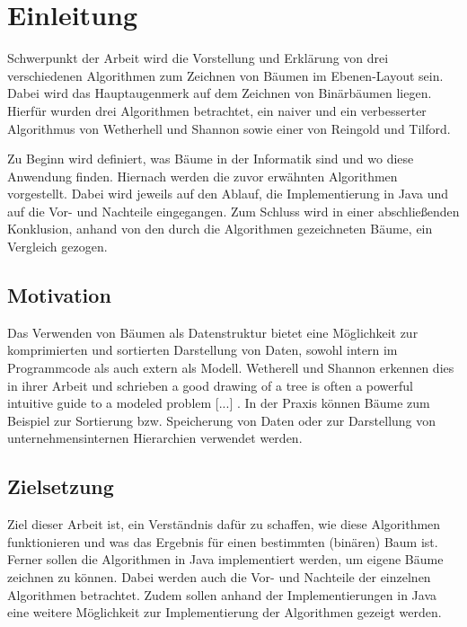 \chapter{Einleitung}
\label{chap:einleitung}
Schwerpunkt der Arbeit wird die Vorstellung und Erklärung von drei verschiedenen Algorithmen zum
Zeichnen von Bäumen im Ebenen-Layout sein. Dabei wird das Hauptaugenmerk auf dem Zeichnen
von Binärbäumen liegen. Hierfür wurden drei Algorithmen betrachtet, ein naiver und ein verbesserter Algorithmus von
Wetherhell und Shannon sowie einer von Reingold und Tilford. 

Zu Beginn wird definiert, was Bäume in der Informatik sind und wo diese Anwendung finden. Hiernach werden die zuvor erwähnten Algorithmen
vorgestellt. Dabei wird jeweils auf den Ablauf, die Implementierung in Java und auf die Vor- und Nachteile eingegangen. 
Zum Schluss wird in einer abschließenden Konklusion, anhand von den durch die Algorithmen gezeichneten Bäume, ein Vergleich gezogen.

\section{Motivation}
\label{sec:motivation}
Das Verwenden von Bäumen als Datenstruktur bietet eine Möglichkeit zur komprimierten und sortierten Darstellung von Daten, 
sowohl intern im Programmcode als auch extern als Modell. Wetherell und Shannon erkennen dies in ihrer Arbeit und schrieben 
\glqq[...] a good drawing of a tree is often a powerful intuitive guide to a modeled problem [...]\grqq{} \cite[S.514]{q1}. In der Praxis können Bäume 
zum Beispiel zur Sortierung bzw. Speicherung von Daten oder zur Darstellung von unternehmensinternen Hierarchien verwendet werden. 

\section{Zielsetzung}
\label{sec:zielsetzung}
Ziel dieser Arbeit ist, ein Verständnis dafür zu schaffen, wie diese Algorithmen funktionieren
und was das Ergebnis für einen bestimmten (binären) Baum ist. Ferner sollen die
Algorithmen in Java implementiert werden, um eigene Bäume zeichnen zu können. Dabei werden auch die Vor- und Nachteile der einzelnen Algorithmen
betrachtet. Zudem sollen anhand der Implementierungen in Java
eine weitere Möglichkeit zur Implementierung der Algorithmen gezeigt werden. 
